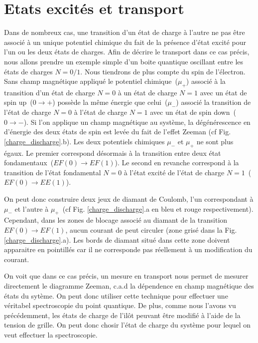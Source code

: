 \section{Etats excités et transport}

Dans de nombreux cas, une transition d'un état de charge à l'autre ne pas être associé à un unique potentiel chimique du fait de la présence d'état excité pour l'un ou les deux états de charges. Afin de décrire le transport dans ce cas précis, nous allons prendre un exemple simple d'un boite quantique oscillant entre les états de charges $N=0/1$. Nous tiendrons de plus compte du spin de l'électron. Sans champ magnétique appliqué le potentiel chimique~($\mu_{+}$) associé à la transition d'un état de charge $N=0$ à un état de charge $N=1$ avec un état de spin up~($0\rightarrow +$) possède la m\^eme énergie que celui~($\mu_{-}$) associé la transition de l'état de charge $N=0$ à l'état de charge $N=1$ avec un état de spin down~($0\rightarrow -$).
Si l'on applique un champ magnétique au système, la dégénérescence en d'énergie des deux états de spin est levée du fait de l'effet Zeeman (cf Fig. \ref{charge_discharge}.b). Les deux potentiels chimiques $\mu_{-}$ et $\mu_{+}$ ne sont plus égaux. Le premier correspond désormais à la transition entre deux état fondamentaux~($EF(0)\rightarrow EF(1)$). Le second en revanche correspond à la transition de l'état fondamental $N=0$ à l'état excité de l'état de charge $N=1$~($EF(0)\rightarrow EE(1)$).

On peut donc construire deux jeux de diamant de Coulomb, l'un correspondant à $\mu_{-}$ et l'autre à $\mu_{+}$~(cf Fig. \ref{charge_discharge}.a en bleu et rouge respectivement). Cependant, dans les zones de blocage associé au diamant de la transition $EF(0)\rightarrow EF(1)$, aucun courant de peut circuler (zone grisé dans la Fig.\ref{charge_discharge}.a). Les bords de diamant situé dans cette zone doivent apparaitre en pointillés car il ne corresponde pas réellement à un modification du courant.

On voit que dans ce cas précis, un mesure en transport nous permet de mesurer directement le diagramme Zeeman, c.a.d la dépendence en champ magnétique des états du sytème. On peut donc utiliser cette technique pour effectuer une véritabel spectroscopie du point quantique. De plus, comme nous l'avons vu précédemment, les états de charge de l'il\^ot peuvant \^etre modifié à l'aide de la tension de grille. On peut donc chosir l'état de charge du système pour lequel on veut effectuer la spectroscopie.

